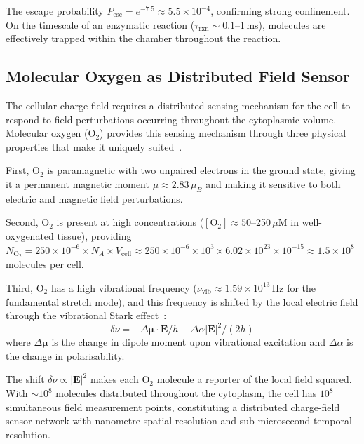 \documentclass[12pt,a4paper]{article}
\theoremstyle{definition}
\theoremstyle{remark}
\newcommand{\vv}[1]{\boldsymbol{#1}}
\begin{document}
The escape probability $P_{\mathrm{esc}} = e^{-7.5} \approx 5.5 \times 10^{-4}$, confirming strong confinement. On the timescale of an enzymatic reaction ($\tau_{\mathrm{rxn}} \sim 0.1$--1\,ms), molecules are effectively trapped within the chamber throughout the reaction.

\subsection{Molecular Oxygen as Distributed Field Sensor}

The cellular charge field requires a distributed sensing mechanism for the cell to respond to field perturbations occurring throughout the cytoplasmic volume. Molecular oxygen ($\mathrm{O}_2$) provides this sensing mechanism through three physical properties that make it uniquely suited~\cite{Pauling1931,Ochiai2008}.

First, $\mathrm{O}_2$ is paramagnetic with two unpaired electrons in the ground state, giving it a permanent magnetic moment $\mu \approx 2.83\,\mu_B$ and making it sensitive to both electric and magnetic field perturbations.

Second, $\mathrm{O}_2$ is present at high concentrations ($[\mathrm{O}_2] \approx 50$--250\,$\mu$M in well-oxygenated tissue), providing $N_{\mathrm{O}_2} = 250 \times 10^{-6} \times N_A \times V_{\mathrm{cell}} \approx 250 \times 10^{-6} \times 10^3 \times 6.02 \times 10^{23} \times 10^{-15} \approx 1.5 \times 10^8$ molecules per cell.

Third, $\mathrm{O}_2$ has a high vibrational frequency ($\nu_{\mathrm{vib}} \approx 1.59 \times 10^{13}$\,Hz for the fundamental stretch mode), and this frequency is shifted by the local electric field through the vibrational Stark effect~\cite{Oklejas2002,Boxer2009}:
\begin{equation}
  \delta\nu = -\Delta\vv{\mu} \cdot \vv{E} / h - \Delta\alpha |\vv{E}|^2 / (2h)
  \label{eq:stark_effect}
\end{equation}
where $\Delta\vv{\mu}$ is the change in dipole moment upon vibrational excitation and $\Delta\alpha$ is the change in polarisability.

The shift $\delta\nu \propto |\vv{E}|^2$ makes each $\mathrm{O}_2$ molecule a reporter of the local field squared. With $\sim\!10^8$ molecules distributed throughout the cytoplasm, the cell has $10^8$ simultaneous field measurement points, constituting a distributed charge-field sensor network with nanometre spatial resolution and sub-microsecond temporal resolution.
\end{document}
